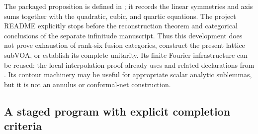 The packaged proposition 
is defined in ; it records
the linear symmetries and axis sums together with the quadratic,
cubic, and quartic equations. The project README explicitly stops
before the reconstruction theorem and categorical conclusions of
the separate infinitude manuscript. Thus this development does not
prove exhaustion of rank-six fusion categories, construct the
present lattice subVOA, or establish its complete unitarity. Its
finite Fourier infrastructure can be reused: the local interpolation
proof already uses  and related declarations from
. Its contour machinery
may be useful for appropriate scalar analytic sublemmas, but it is
not an annulus or conformal-net construction.

\subsection{A staged program with explicit completion criteria}

